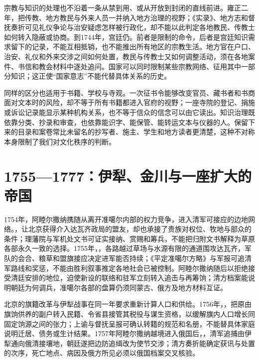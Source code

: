 宗教与知识的处理也不沿着一条从禁到用、或从开放到封闭的直线前进。雍正二年，把传教、地方教民与外来人员一并纳入地方治理的视野；《实录》、地方志和督抚奏折可见礼仪争论与治安疑虑怎样被行政化，却不能以此判定各地教民、传教士如何转入隐蔽或协商。到1744年，宫廷仍。前者是限制的命令，后者是宫廷知识需求留下的记录，不能互相抵销，也不能推出所有地区的宗教生活。地方官在户口、治安、礼仪和外来交涉之间如何处置，教民与传教士又如何调整活动，须在各地案件、书信和教会材料中逐处追问。国家可以同时限制某些宗教网络、征用其中一部分知识；这正使“国家意志”不能代替具体关系的历史。

同样的区分也适用于书籍、学校与寺观。一次征书令能够改变官员、藏书者和书商面对文本时的风险，却不等于所有书籍都进入官府的视野；一座寺院的登记、捐施或诉讼记录能显示某种机构关系，也不等于信众的信念可以由它读出。知识治理既依靠分类、抄录和审查，也依靠能识字、能保管、能转运文本与仪器的人。保留下来的目录和案卷常比未留名的抄写者、施主、学生和地方读者更清楚，这种不对称本身限制了我们对文化秩序的判断。

\section{1755—1777：伊犁、金川与一座扩大的帝国}

1754年，阿睦尔撒纳携随从离开准噶尔内部的权力竞争，进入清军可接应的边地网络。，让北京获得介入达瓦齐政局的盟友，却也承接了贵族对权位、牧地与部众的条件；理藩院与军机处文书可证实接纳、赏赐和筹兵，不能把归附文书解释为草原各部永久一致的选择。1755年，，各路越过草场与水源有限的通道围攻达瓦齐，军队的会合、粮草和盟旗接应决定进军能否持续；《平定准噶尔方略》与军报可追清军路线和奖惩，不能由胜利叙事推定各地社会已被控制。阿睦尔撒纳随后以拒绝接受清廷安排的地位，迫使新设的联络和驻军立刻转入追击与再筹饷；清方档案能说明朝廷为何调兵，准噶尔各部的盘算仍须同蒙古、俄方及地方材料互证。

北京的旗籍改革与伊犁战事在同一年要求重新计算人口和供给。1756年，，把原由旗饷供养的副户转入民籍、令省县接管其税役与谋生资格，以缓解旗内人口增长同固定饷源之间的张力；上谕与督抚呈报可确认转籍的规范和名册，不能替具体家庭说明迁居、债务或生计结果。1757年阿睦尔撒纳越境进入俄国后，，清军追捕由伊犁通向俄清接壤地，朝廷遂把边防追缉改为使节交涉；清方奏折能确定获讯与处置的次序，死亡地点、病因及俄方所见必须以俄国档案交叉核验。

